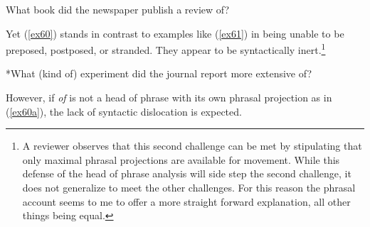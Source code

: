\documentclass[output=paper,
modfonts
]{LSP/langsci}
\begin{document}
\begin{exe}
\ex\label{ex61}
\begin{xlist}
\end{xlist}

\ex\label{ex61a}
\begin{xlist}
\end{xlist}

\ex\label{ex61b}  What book did the newspaper publish a review of?

\end{exe}

Yet ({\ref{ex60}}) stands in contrast to examples like ({\ref{ex61}}) in being unable to be preposed, postposed, or stranded.  They appear to be syntactically inert.{\footnote{A reviewer observes that this second challenge can be met by stipulating that only maximal phrasal projections are available for movement.  While this defense of the head of phrase analysis will side step the second challenge, it does not generalize to meet the other challenges.  For this reason the phrasal  account seems to me to offer a more straight forward explanation, all other things being equal.}}
\begin{exe}
\ex \label{ex62}
\begin{xlist}
\end{xlist}
\ex \label{ex62a}
\begin{xlist}
\end{xlist}
\ex \label{ex62b} *What (kind of) experiment did the journal report more extensive of?
\end{exe}
However, if \textit{of} is not a head of phrase with its own phrasal projection as in ({\ref{ex60a}}), the lack of syntactic dislocation is expected.
\end{document}
